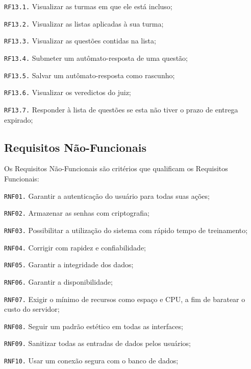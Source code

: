 \documentclass[
	12pt,				%
	openany,
	oneside,
	a4paper,			%
	english,			%
	brazil				%
	]{abntex2}
\begin{document}
\begin{alineas}
\begin{alineas}
    \item[\texttt{RF13.1.}] Visualizar as turmas em que ele está incluso;
    \item[\texttt{RF13.2.}] Visualizar as listas aplicadas à sua turma;
    \item[\texttt{RF13.3.}] Visualizar as questões contidas na lista;
    \item[\texttt{RF13.4.}] Submeter um autômato-resposta de uma questão;
    \item[\texttt{RF13.5.}] Salvar um autômato-resposta como rascunho;
    \item[\texttt{RF13.6.}] Visualizar os veredictos do juiz;
    \item[\texttt{RF13.7.}] Responder à lista de questões se esta não tiver o prazo de entrega expirado;
  \end{alineas}
\end{alineas}

\subsection{Requisitos Não-Funcionais}
  Os Requisitos Não-Funcionais são critérios que qualificam os Requisitos Funcionais:

  \begin{alineas}
    \item[\texttt{RNF01.}] Garantir a autenticação do usuário para todas suas ações;
    \item[\texttt{RNF02.}] Armazenar as senhas com criptografia;
    \item[\texttt{RNF03.}] Possibilitar a utilização do sistema com rápido tempo de treinamento;
    \item[\texttt{RNF04.}] Corrigir com rapidez e confiabilidade;
    \item[\texttt{RNF05.}] Garantir a integridade dos dados;
    \item[\texttt{RNF06.}] Garantir a disponibilidade;
    \item[\texttt{RNF07.}] Exigir o mínimo de recursos como espaço e CPU, a fim de baratear o custo do servidor;
    \item[\texttt{RNF08.}] Seguir um padrão estético em todas as interfaces;
    \item[\texttt{RNF09.}] Sanitizar todas as entradas de dados pelos usuários;
    \item[\texttt{RNF10.}] Usar um conexão segura com o banco de dados;
\end{alineas}
\end{document}
